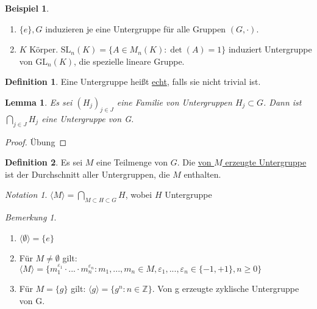 \documentclass[12pt]{scrartcl}%
\newtheorem{lemma}{Lemma}
\theoremstyle{definition}
\newtheorem*{defn}{Definition}
\newtheorem{ex}{Beispiel}
\theoremstyle{remark}
\newtheorem*{notation}{Notation}
\newtheorem*{nb}{Bemerkung}
\newcommand{\gl}{\text{GL}}
\begin{document}
\begin{ex}
    \begin{enumerate}[label=(\alph*)]
        \item $\{e\}, G$ induzieren je eine Untergruppe für alle Gruppen $(G,\cdot)$.
        \item $K$ Körper. $\text{SL}_n(K)=\{A\in M_n(K): \det(A)=1\}$ induziert Untergruppe von $\gl_n(K)$, die spezielle lineare Gruppe.
    \end{enumerate}
\end{ex}

\begin{defn}
    Eine Untergruppe heißt \underline{echt}, falls sie nicht trivial ist. %
\end{defn}

\begin{lemma}
	Es sei $(H_{j})_{j \in J}$ eine Familie von Untergruppen $H_{j} \subset G$. Dann ist $\bigcap_{j \in J}H_{j}$ eine Untergruppe von G.
\end{lemma}

\begin{proof}
	Übung
\end{proof}

\begin{defn}
	Es sei $M$ eine Teilmenge von $G$. Die \underline{von $M$ erzeugte Untergruppe} ist der Durchschnitt aller Untergruppen, die $M$ enthalten.
\end{defn}

\begin{notation}
	$\langle M \rangle =\bigcap_{M \subset H \subset G}H$, wobei $H$ Untergruppe
\end{notation}

\begin{nb}
	\begin{enumerate}[label=(\alph*)]
		\item $\langle \emptyset \rangle = \lbrace e \rbrace$
		\item Für $M \neq \emptyset$ gilt: $\langle M \rangle = \lbrace m_{1}^{\varepsilon_{1}} \cdot ... \cdot m_{n}^{\varepsilon_{n}} : m_{1},...,m_{n} \in M, \varepsilon_{1},...,\varepsilon_{n} \in \lbrace -1,+1\rbrace, n \geq 0 \rbrace$
		\item Für $M = \lbrace g \rbrace$ gilt: $\langle g \rangle = \lbrace g^{n} : n \in \mathbb{Z} \rbrace$. Von g erzeugte zyklische Untergruppe von G.
	\end{enumerate}
\end{nb}
\end{document}
